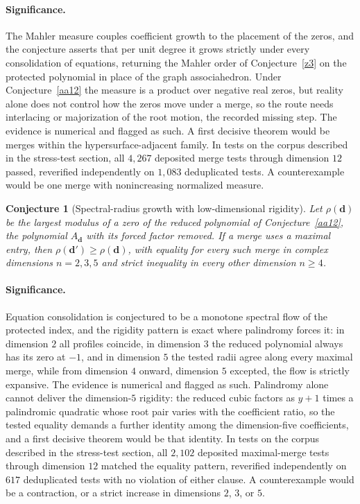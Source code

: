 \documentclass[11pt]{article}
\newtheorem{conjecture}{Conjecture}
\theoremstyle{definition}
\begin{document}
\paragraph{Significance.}
The Mahler measure couples coefficient growth to the placement of the zeros, and the conjecture asserts that per unit degree it grows strictly under every consolidation of equations, returning the Mahler order of Conjecture~\ref{z3} on the protected polynomial in place of the graph associahedron.  Under Conjecture~\ref{aa12} the measure is a product over negative real zeros, but reality alone does not control how the zeros move under a merge, so the route needs interlacing or majorization of the root motion, the recorded missing step.  The evidence is numerical and flagged as such.  A first decisive theorem would be merges within the hypersurface-adjacent family.  In tests on the corpus described in the stress-test section, all $4{,}267$ deposited merge tests through dimension $12$ passed, reverified independently on $1{,}083$ deduplicated tests.  A counterexample would be one merge with nonincreasing normalized measure.

\begin{conjecture}[Spectral-radius growth with low-dimensional rigidity]\label{aa15}
Let $\rho(\mathbf d)$ be the largest modulus of a zero of the reduced polynomial of Conjecture~\ref{aa12}, the polynomial $A_{\mathbf d}$ with its forced factor removed.  If a merge uses a maximal entry, then $\rho(\mathbf d')\ge\rho(\mathbf d)$, with equality for every such merge in complex dimensions $n=2,3,5$ and strict inequality in every other dimension $n\ge4$.
\end{conjecture}

\paragraph{Significance.}
Equation consolidation is conjectured to be a monotone spectral flow of the protected index, and the rigidity pattern is exact where palindromy forces it: in dimension $2$ all profiles coincide, in dimension $3$ the reduced polynomial always has its zero at $-1$, and in dimension $5$ the tested radii agree along every maximal merge, while from dimension $4$ onward, dimension $5$ excepted, the flow is strictly expansive.  The evidence is numerical and flagged as such.  Palindromy alone cannot deliver the dimension-$5$ rigidity: the reduced cubic factors as $y+1$ times a palindromic quadratic whose root pair varies with the coefficient ratio, so the tested equality demands a further identity among the dimension-five coefficients, and a first decisive theorem would be that identity.  In tests on the corpus described in the stress-test section, all $2{,}102$ deposited maximal-merge tests through dimension $12$ matched the equality pattern, reverified independently on $617$ deduplicated tests with no violation of either clause.  A counterexample would be a contraction, or a strict increase in dimensions $2$, $3$, or $5$.
\end{document}

